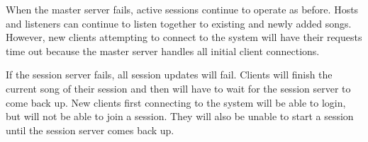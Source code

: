 When the master server fails, active sessions continue to
operate as before. Hosts and listeners can continue to listen
together to existing and newly added songs. However, new clients
attempting to connect to the system will have their requests time
out because the master server handles all initial client connections.

If the session server fails, all session updates will fail.
Clients will finish the current song of their session and then
will have to wait for the session server to come back up. New clients
first connecting to the system will be able to login, but will not
be able to join a session. They will also be unable to start a session until
the session server comes back up.